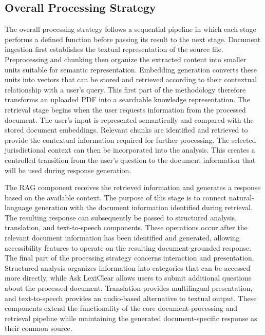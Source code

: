 \documentclass[12pt,a4paper,oneside]{report}
\begin{document}
\subsection{Overall Processing Strategy}

The overall processing strategy follows a sequential pipeline in which each
stage performs a defined function before passing its result to the next
stage. Document ingestion first establishes the textual representation of
the source file. Preprocessing and chunking then organize the extracted
content into smaller units suitable for semantic representation. Embedding
generation converts these units into vectors that can be stored and
retrieved according to their contextual relationship with a user's query.
This first part of the methodology therefore transforms an uploaded PDF
into a searchable knowledge representation. The retrieval stage begins when the user requests information from the
processed document. The user's input is represented semantically and
compared with the stored document embeddings. Relevant chunks are identified
and retrieved to provide the contextual information required for further
processing. The selected jurisdictional context can then be incorporated
into the analysis. This creates a controlled transition from the user's
question to the document information that will be used during response
generation. 

The RAG component receives the retrieved information and generates a
response based on the available context. The purpose of this stage is to
connect natural-language generation with the document information identified
during retrieval. The resulting response can subsequently be passed to
structured analysis, translation, and text-to-speech components. These
operations occur after the relevant document information has been identified
and generated, allowing accessibility features to operate on the resulting
document-grounded response. The final part of the processing strategy concerns interaction and
presentation. Structured analysis organizes information into categories
that can be accessed more directly, while Ask LexiClear allows users to
submit additional questions about the processed document. Translation
provides multilingual presentation, and text-to-speech provides an
audio-based alternative to textual output. These components extend the
functionality of the core document-processing and retrieval pipeline while
maintaining the generated document-specific response as their common source.
\end{document}
